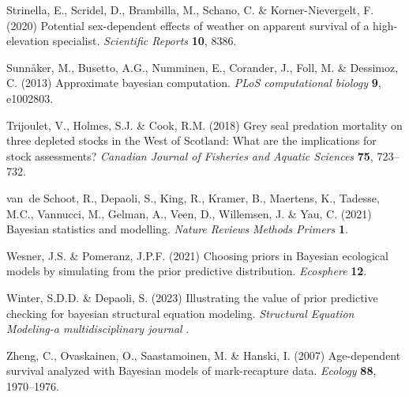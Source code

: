\documentclass[11pt]{article}
\begin{document}
\begin{thebibliography}{35}
Strinella, E., Scridel, D., Brambilla, M., Schano, C. \& Korner-Nievergelt, F.
  (2020) Potential sex-dependent effects of weather on apparent survival of a
  high-elevation specialist. \emph{Scientific Reports} \textbf{10}, 8386.

Sunn{\aa}ker, M., Busetto, A.G., Numminen, E., Corander, J., Foll, M. \&
  Dessimoz, C. (2013) Approximate bayesian computation. \emph{PLoS
  computational biology} \textbf{9}, e1002803.

Trijoulet, V., Holmes, S.J. \& Cook, R.M. (2018) {Grey seal predation mortality
  on three depleted stocks in the West of Scotland: What are the implications
  for stock assessments?} \emph{Canadian Journal of Fisheries and Aquatic
  Sciences} \textbf{75}, 723--732.

van~de Schoot, R., Depaoli, S., King, R., Kramer, B., Maertens, K., Tadesse,
  M.C., Vannucci, M., Gelman, A., Veen, D., Willemsen, J. \& Yau, C. (2021)
  Bayesian statistics and modelling. \emph{Nature Reviews Methods Primers}
  \textbf{1}.

Wesner, J.S. \& Pomeranz, J.P.F. (2021) {Choosing priors in Bayesian ecological
  models by simulating from the prior predictive distribution}.
  \emph{Ecosphere} \textbf{12}.

Winter, S.D.D. \& Depaoli, S. (2023) Illustrating the value of prior predictive
  checking for bayesian structural equation modeling. \emph{Structural Equation
  Modeling-a multidisciplinary journal} .

Zheng, C., Ovaskainen, O., Saastamoinen, M. \& Hanski, I. (2007) {Age-dependent
  survival analyzed with Bayesian models of mark-recapture data}.
  \emph{Ecology} \textbf{88}, 1970--1976.

\end{thebibliography}


\clearpage
\end{document}
